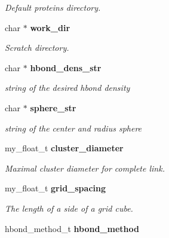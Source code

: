 \begin{CompactItemize}
\begin{CompactList}\small\item\em Default proteins directory. \item\end{CompactList}\item 
char $\ast$ \bf{work\_\-dir}\label{structSimSite3D_1_1sitemap__variables__t_b4c8e92a25e8659139365e489cf7d5d3}

\begin{CompactList}\small\item\em Scratch directory. \item\end{CompactList}\item 
char $\ast$ \bf{hbond\_\-dens\_\-str}\label{structSimSite3D_1_1sitemap__variables__t_8d23a8f0fece77b6720972a9ccb38771}

\begin{CompactList}\small\item\em string of the desired hbond density \item\end{CompactList}\item 
char $\ast$ \bf{sphere\_\-str}\label{structSimSite3D_1_1sitemap__variables__t_9d1d9d528f2e67c292a79eb12d343f2b}

\begin{CompactList}\small\item\em string of the center and radius sphere \item\end{CompactList}\item 
my\_\-float\_\-t \bf{cluster\_\-diameter}\label{structSimSite3D_1_1sitemap__variables__t_e2234821022ddc0b1bfd001fbc29d035}

\begin{CompactList}\small\item\em Maximal cluster diameter for complete link. \item\end{CompactList}\item 
my\_\-float\_\-t \bf{grid\_\-spacing}\label{structSimSite3D_1_1sitemap__variables__t_90d5f33a206ea3f421bba55e2e72601b}

\begin{CompactList}\small\item\em The length of a side of a grid cube. \item\end{CompactList}\item 
hbond\_\-method\_\-t \bf{hbond\_\-method}\label{structSimSite3D_1_1sitemap__variables__t_8569b43e6c79f7a203cf8c6f47bf34c6}


\end{CompactItemize}
